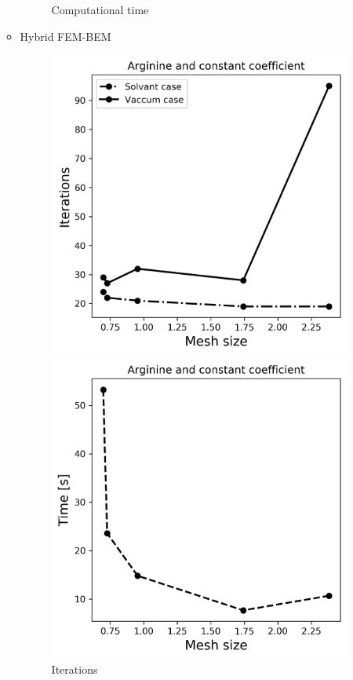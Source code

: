 \begin{itemize}
\begin{itemize}
\begin{figure}[!htb]
  \caption{Computational time}
\endminipage
\end{figure}
        \item Hybrid FEM-BEM
\begin{figure}[!htb]
  \includegraphics[width=\linewidth]{Hybrid_FEM_BEM_Arginine_const_coeff_iter.png}
  \caption{Iterations}
\endminipage\hfill
{}%
  \includegraphics[width=\linewidth]{Hybrid_FEM_BEM_Arginine_const_coeff_time.png}

\end{figure}
\end{itemize}
\end{itemize}
